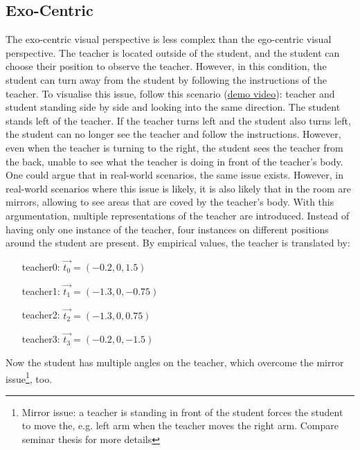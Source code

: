 \subsection{Exo-Centric}
The exo-centric visual perspective is less complex than the ego-centric visual perspective. The teacher is located outside of the student, and the student can choose their position to observe the teacher. However, in this condition, the student can turn away from the student by following the instructions of the teacher. To visualise this issue, follow this scenario (\href{https://www.youtube.com/watch?v=mRG22RBXKTM&feature=youtu.be}{demo video}): teacher and student standing side by side and looking into the same direction. The student stands left of the teacher. If the teacher turns left and the student also turns left, the student can no longer see the teacher and follow the instructions. However, even when the teacher is turning to the right, the student sees the teacher from the back, unable to see what the teacher is doing in front of the teacher's body. One could argue that in real-world scenarios, the same issue exists. However, in real-world scenarios where this issue is likely, it is also likely that in the room are mirrors, allowing to see areas that are coved by the teacher's body. With this argumentation, multiple representations of the teacher are introduced. Instead of having only one instance of the teacher, four instances on different positions around the student are present. By empirical values, the teacher is translated by:
\begin{itemize}
	\centering
	\item[teacher0:] $\vec{t_0} = (-0.2,0,1.5)$
	\item[teacher1:] $\vec{t_1} = (-1.3,0,-0.75)$
	\item[teacher2:] $\vec{t_2} = (-1.3,0,0.75)$
	\item[teacher3:] $\vec{t_3} = (-0.2,0,-1.5)$
\end{itemize}

Now the student has multiple angles on the teacher, which overcome the mirror issue\footnote{Mirror issue: a teacher is standing in front of the student forces the student to move the, e.g. left arm when the teacher moves the right arm. Compare seminar thesis for more details}, too.
